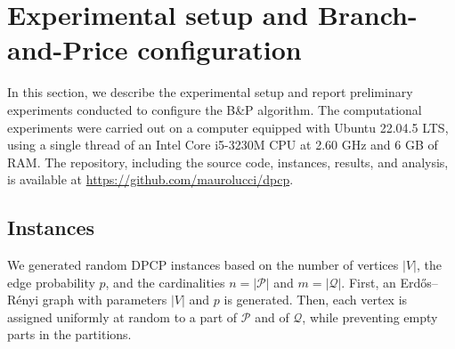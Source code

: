 \documentclass[preprint, 11pt, authoryear]{elsarticle}
\newcommand{\PP}{{\mathcal P}}
\newcommand{\QQ}{{\mathcal Q}}
\begin{document}
\section{Experimental setup and Branch-and-Price configuration}
\label{sec:B&Pconfigurations}

In this section, we describe the experimental setup and report preliminary experiments conducted to configure the B\&P algorithm. 
The computational experiments were carried out on a computer equipped with Ubuntu 22.04.5 LTS, using a single thread of an Intel Core i5-3230M CPU at 2.60 GHz and 6 GB of RAM.  
The repository, including the source code, instances, results, and analysis, is available at \url{https://github.com/maurolucci/dpcp}.

\subsection{Instances}

We generated random DPCP instances based on the number of vertices $|V|$, the edge probability $p$, and the cardinalities  $n = |\PP|$ and $m = |\QQ|$. 
First, an Erd\H{o}s--Rényi graph with parameters $|V|$ and $p$ is generated. 
Then, each vertex is assigned uniformly at random to a part of $\PP$ and of $\QQ$, while preventing  empty parts in the partitions.
\end{document}
